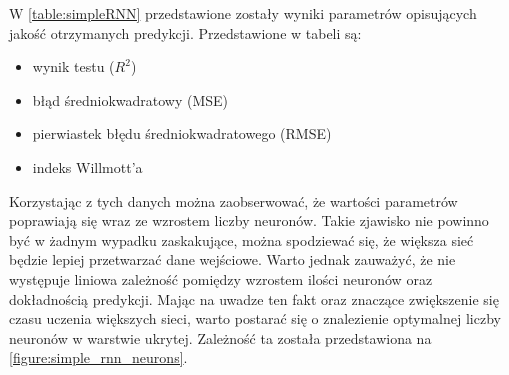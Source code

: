 \documentclass[10pt,a4paper]{article}
\begin{document}
W \autoref{table:simpleRNN} przedstawione zostały wyniki parametrów opisujących jakość otrzymanych predykcji. Przedstawione w tabeli są:
\begin{center}
	\begin{itemize}
		\item wynik testu ($R^2$)
		\item błąd średniokwadratowy (MSE)
		\item pierwiastek błędu średniokwadratowego (RMSE)
		\item indeks Willmott'a
	\end{itemize}
\end{center}

Korzystając z tych danych można zaobserwować, że wartości parametrów poprawiają się wraz ze wzrostem liczby neuronów. Takie zjawisko nie powinno być w żadnym wypadku zaskakujące, można spodziewać się, że większa sieć będzie lepiej przetwarzać dane wejściowe. Warto jednak zauważyć, że nie występuje liniowa zależność pomiędzy wzrostem ilości neuronów oraz dokładnością predykcji. Mając na uwadze ten fakt oraz znaczące zwiększenie się czasu uczenia większych sieci, warto postarać się o znalezienie optymalnej liczby neuronów w warstwie ukrytej. Zależność ta została przedstawiona na \autoref{figure:simple_rnn_neurons}.
\end{document}
